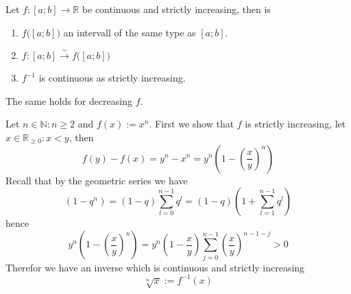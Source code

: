 \begin{theorem}
   Let \(f: [a;b] \to \mathbb{R}\) be continuous and strictly increasing, then is
   \begin{enumerate}[label=\roman*, align=Center]
      \item \(f\big([a;b]\big)\) an intervall of the same type as \([a;b]\).
      \item \(f:[a;b] \xrightarrow{\sim} f\big([a;b]\big)\)
      \item \(f^{-1}\) is continuous as strictly increasing.
   \end{enumerate}
\end{theorem}
\begin{remark}
   The same holds for decreasing \(f\).
\end{remark}
\begin{example}
   Let \(n \in \mathbb{N}: n \geq 2\) and \(f(x) := x^n\).
   First we show that \(f\) is strictly increasing, let \(x \in \mathbb{R}_{\geq 0}: x < y\), then
   \[f(y) - f(x) = y^n - x^n = y^n \left(1 - \left(\frac{x}{y}\right)^n\right)\]
   Recall that by the geometric series we have
   \[(1- q^n) = (1-q) \sum_{l=0}^{n-1} q^l = (1-q)\left(1 + \sum_{l=1}^{n-1} q^l\right)\]
   hence
   \[y^n \left(1 - \left(\frac{x}{y}\right)^n\right) = y^n \left(1 - \frac{x}{y}\right) \sum_{j=0}^{n-1} \left(\frac{x}{y}\right)^{n-1-j} > 0\]
   Therefor we have an inverse which is continuous and strictly increasing
   \[\sqrt[n]{x} := f^{-1}(x)\]
\end{example}

